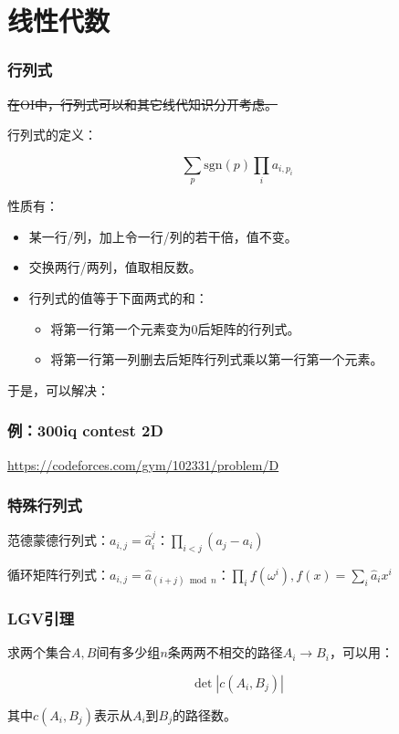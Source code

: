 \documentclass[10pt]{beamer}
\begin{document}
	\section{线性代数}
	\begin{frame}
		\frametitle{行列式}
	
		\sout{在OI中，行列式可以和其它线代知识分开考虑。}

		行列式的定义：

		$$
		\sum_{p}\mathrm{sgn}(p)\prod_i a_{i,p_i}
		$$

		性质有：

		\begin{itemize}
			\item 某一行/列，加上令一行/列的若干倍，值不变。
			\item 交换两行/两列，值取相反数。
			\item 行列式的值等于下面两式的和：
			\begin{itemize}
				\item 将第一行第一个元素变为$0$后矩阵的行列式。
				\item 将第一行第一列删去后矩阵行列式乘以第一行第一个元素。
			\end{itemize}
		\end{itemize}

		于是，可以解决：
	
	\end{frame}
	\begin{frame}
		\frametitle{例：300iq contest 2D}
	
		\url{https://codeforces.com/gym/102331/problem/D}
	
	\end{frame}
	\begin{frame}
		\frametitle{特殊行列式}
	
		范德蒙德行列式：$a_{i,j}=\hat a_i^j$：$\prod_{i<j}(a_j-a_i)$

		循环矩阵行列式：$a_{i,j}=\hat a_{(i+j)\bmod n}$：$\prod_i f(\omega^i),f(x)=\sum_i \hat a_ix^i$
	
	\end{frame}
	\begin{frame}
		\frametitle{LGV引理}
	
		求两个集合$A,B$间有多少组$n$条两两不相交的路径$A_i\rightarrow B_i$，可以用：

		$$
		\det |c(A_i,B_j)|
		$$

		其中$c(A_i,B_j)$表示从$A_i$到$B_j$的路径数。
	
	\end{frame}
\end{document}

